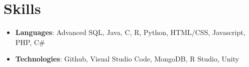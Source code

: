 \documentclass[letterpaper,11pt]{article}
\newcommand{\resumeItem}[2]{
  \item\small{
    \textbf{#1}{: #2 \vspace{-2pt}}
  }
}
\newcommand{\resumeSubItem}[2]{\resumeItem{#1}{#2}\vspace{-4pt}}
\newcommand{\resumeSubHeadingListStart}{\begin{itemize}[leftmargin=*]}
\newcommand{\resumeSubHeadingListEnd}{\end{itemize}}
\begin{document}
  \section{Skills}
  \resumeSubHeadingListStart
    \resumeSubItem{Languages}
      {Advanced SQL, Java, C, R, Python, HTML/CSS, Javascript, PHP, C\#}
      \resumeSubItem{Technologies}
      {Github, Visual Studio Code, MongoDB, R Studio, Unity}

   \resumeSubHeadingListEnd



\end{document}

